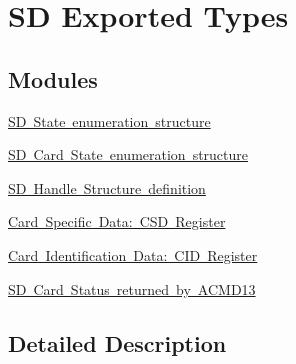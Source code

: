 \hypertarget{group___s_d___exported___types}{}\section{SD Exported Types}
\label{group___s_d___exported___types}
\subsection*{Modules}
\begin{DoxyCompactItemize}
\item 
\mbox{\hyperlink{group___s_d___exported___types___group1}{S\+D State enumeration structure}}
\item 
\mbox{\hyperlink{group___s_d___exported___types___group2}{S\+D Card State enumeration structure}}
\item 
\mbox{\hyperlink{group___s_d___exported___types___group3}{S\+D Handle Structure definition}}
\item 
\mbox{\hyperlink{group___s_d___exported___types___group4}{Card Specific Data\+: C\+S\+D Register}}
\item 
\mbox{\hyperlink{group___s_d___exported___types___group5}{Card Identification Data\+: C\+I\+D Register}}
\item 
\mbox{\hyperlink{group___s_d___exported___types___group6}{S\+D Card Status returned by A\+C\+M\+D13}}
\end{DoxyCompactItemize}


\subsection{Detailed Description}
